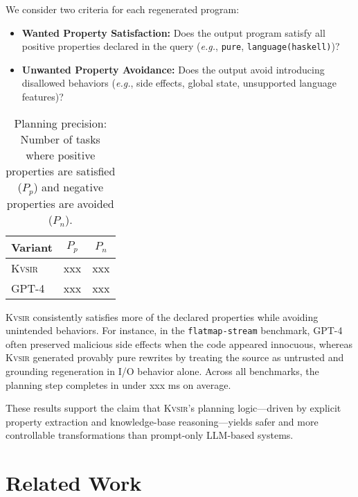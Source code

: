 \documentclass[sigplan]{acmart}
\def\eg{{\em e.g.}, }
\newcommand{\sys}{{\scshape Kv{\textalpha}sir}\xspace}
\newcommand{\xxx}{\colorbox{red!30}{xxx}\xspace}
\begin{document}
We consider two criteria for each regenerated program:

\begin{itemize}
  \item \textbf{Wanted Property Satisfaction:} Does the output program satisfy all positive properties declared in the query (\eg \texttt{pure}, \texttt{language(haskell)})?
  \item \textbf{Unwanted Property Avoidance:} Does the output avoid introducing disallowed behaviors (\eg side effects, global state, unsupported language features)?
\end{itemize}

\begin{table}[h]
  \centering
  \caption{
    Planning precision: Number of tasks where positive properties are satisfied ($P_p$) and negative properties are avoided ($P_n$).
  }
  \begin{tabular}{lcc}
    \toprule
    Variant & $P_{p}$ & $P_{n}$  \\
    \midrule
    \sys & \xxx & \xxx \\
    GPT-4 & \xxx & \xxx \\
    \bottomrule
  \end{tabular}
\end{table}

\sys consistently satisfies more of the declared properties while avoiding unintended behaviors. For instance, in the \texttt{flatmap-stream} benchmark, GPT-4 often preserved malicious side effects when the code appeared innocuous, whereas \sys generated provably pure rewrites by treating the source as untrusted and grounding regeneration in I/O behavior alone.
Across all benchmarks, the planning step completes in under \xxx ms on average.

These results support the claim that \sys's planning logic---driven by explicit
property extraction and knowledge-base reasoning---yields safer and more
controllable transformations than prompt-only LLM-based systems.

\section{Related Work}
\end{document}

